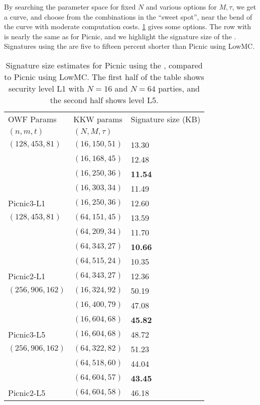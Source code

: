 By searching the parameter space for fixed $N$ and various options for $M,
\tau$, we get a curve, and choose from the combinations in the ``sweet spot'',
near the bend of the curve with moderate computation costs.  \cref{table:sig-sizes}
gives some options. The row with is nearly the same as for Picnic, and we highlight the signature
size of the \ttOWF. Signatures using the \ttOWF are five to fifteen percent shorter than Picnic using LowMC. 
\begin{table}
\begin{centering}
\begin{tabular}{l|l|l}
OWF Params      & KKW params        & Signature size (KB)\\
$(n,m,t)$       & $(N, M, \tau)$    &   \\\hline
$(128,453,81)$  & $(16, 150, 51)$   & 13.30 \\
                & $(16, 168, 45)$   & 12.48 \\ 
                & $(16, 250, 36)$   & \textbf{11.54} \\
                & $(16, 303, 34)$   & 11.49 \\
Picnic3-L1      & $(16, 250, 36)$   & 12.60 \\ \hline
$(128,453,81)$  & $(64, 151, 45)$   & 13.59 \\
                & $(64, 209, 34)$   & 11.70 \\ 
                & $(64, 343, 27)$   & \textbf{10.66} \\
                & $(64, 515, 24)$   & 10.35 \\
Picnic2-L1      & $(64, 343, 27)$   & 12.36 \\ \hline \hline
$(256,906,162)$ & $(16, 324, 92)$   & 50.19 \\ 
                & $(16, 400, 79)$   & 47.08 \\ 
                & $(16, 604, 68)$   & \textbf{45.82} \\ 
Picnic3-L5      & $(16, 604, 68)$   & 48.72 \\ \hline
$(256,906,162)$ & $(64, 322, 82)$   & 51.23 \\
                & $(64, 518, 60)$   & 44.04 \\ 
                & $(64, 604, 57)$   & \textbf{43.45} \\
Picnic2-L5      & $(64, 604, 58)$   & 46.18 \\ \hline
\end{tabular}
\caption{ \label{table:sig-sizes}Signature size estimates for Picnic using the \ttOWF, compared to Picnic using LowMC. 
The first half of the table shows security level L1 with $N=16$ and $N=64$ parties, and the second
half shows level L5.}
\end{centering}
\end{table}


